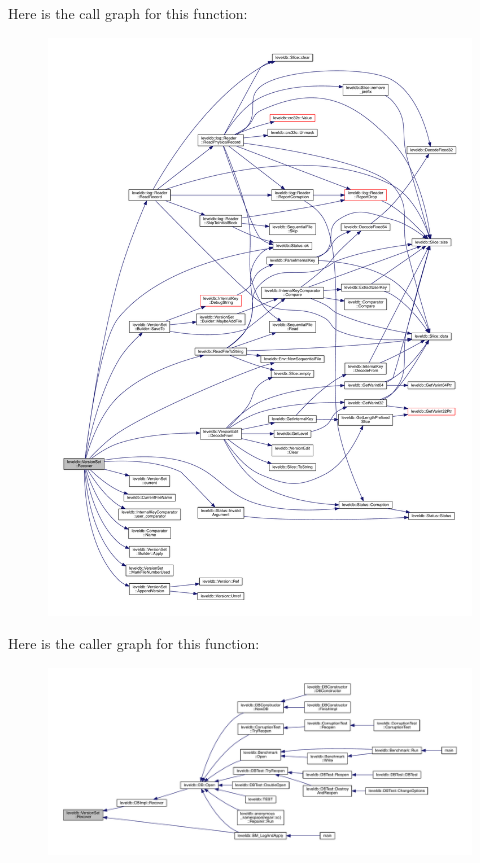 Here is the call graph for this function\+:\nopagebreak
\begin{figure}[H]
\begin{center}
\leavevmode
\includegraphics[width=350pt]{classleveldb_1_1_version_set_a955ff8620ec56742cdc48da0e74ab40b_cgraph}
\end{center}
\end{figure}




Here is the caller graph for this function\+:
\nopagebreak
\begin{figure}[H]
\begin{center}
\leavevmode
\includegraphics[width=350pt]{classleveldb_1_1_version_set_a955ff8620ec56742cdc48da0e74ab40b_icgraph}
\end{center}
\end{figure}


